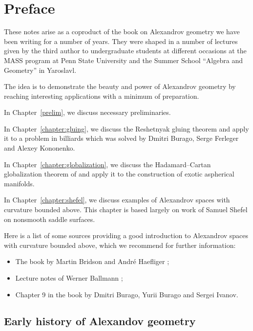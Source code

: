 \mainmatter

\chapter*{Preface}

These notes arise as a coproduct of the book on Alexandrov geometry
we have been writing for  a number of years.
They were shaped in a number of lectures given by the third author
to undergraduate students 
at different  occasions at the
MASS program at Penn State University
and the Summer School ``Algebra and Geometry'' in Yaroslavl.

The idea is to demonstrate the beauty and power of Alexandrov geometry by reaching interesting applications with a minimum of preparation.

\medskip 

In Chapter~\ref{prelim}, we discuss necessary preliminaries.

In Chapter~\ref{chapter:gluing}, we discuss the Reshetnyak gluing theorem and apply it to a problem in billiards which was solved by Dmitri Burago, Serge Ferleger and Alexey Kononenko.

In Chapter~\ref{chapter:globalization}, we discuss the Hadamard--Cartan globalization theorem of  and apply it to the construction of exotic aspherical manifolds.

In Chapter~\ref{chapter:shefel}, we discuss examples of Alexandrov spaces with curvature bounded above.
This chapter is based largely on work of Samuel Shefel on nonsmooth saddle surfaces.

\medskip

Here is a list of some sources providing a good introduction to Alexandrov spaces with curvature bounded above, which we recommend for further information: 

\begin{itemize}
\item The book by Martin Bridson and Andr\'e Haefliger \cite{BH};
\item Lecture notes of Werner Ballmann \cite{ballmann:lectures};
\item Chapter 9 in the book \cite{BBI} by Dmitri Burago, Yurii Burago and Sergei Ivanov.
\end{itemize}

\section*{Early history of Alexandov geometry}


